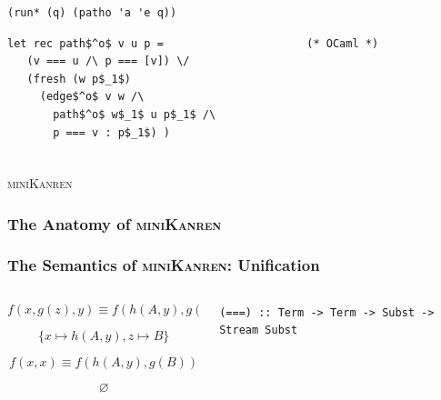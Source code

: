 \documentclass[xcolor={dvipsnames}, aspectratio=169]{beamer}
\renewcommand{\emptyset}{\varnothing}
\newcommand{\mk}{\textsc{miniKanren}\xspace}
\begin{document}
\begin{frame}[fragile]
\begin{columns}
\begin{column}{0.75\textwidth}
\begin{center}
\begin{minipage}{0.82\textwidth}
\begin{lstlisting}[language=racket]
(run* (q) (patho 'a 'e q))
    \end{lstlisting}

    \begin{lstlisting}[language=ocanren]
 let rec path$^o$ v u p =                      (* OCaml *)
   (v === u /\ p === [v]) \/
   (fresh (w p$_1$)
     (edge$^o$ v w /\
       path$^o$ w$_1$ u p$_1$ /\
       p === v : p$_1$) )
         \end{lstlisting}
  \end{minipage}
\end{center}

      \end{column}
    \end{columns}
\end{frame}

\begin{frame}[fragile]
  \frametitle{}

\begin{center}
  \Large \mk
\end{center}

\end{frame}

\begin{frame}[fragile]
  \frametitle{The Anatomy of \mk}



\end{frame}

\begin{frame}[fragile]
  \frametitle{The Semantics of \mk: Unification}

\begin{columns}
  \begin{column}{0.4\textwidth}
    \[ f(x, g(z), y) \equiv f(h(A, y), g(B), y)\] 
  
    \vspace{-0.4cm}
  
    \[ \{x \mapsto h(A, y), z \mapsto B \} \]
  
    \vspace{0.8cm}
  
    \[ f(x, x) \equiv f(h(A, y), g(B))\] 

    \vspace{-0.4cm}

    \[ \emptyset \]
  
  \end{column}
  
  \begin{column}{0.6\textwidth}

    \begin{lstlisting}[language=ocanren]
 (===) :: Term -> Term -> Subst -> Stream Subst 
    \end{lstlisting}
  \end{column}
\end{columns}

\end{frame}
\end{document}
